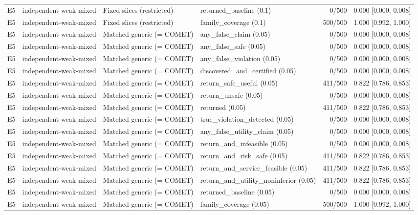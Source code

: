 \begin{longtable}{p{.04\linewidth}p{.18\linewidth}p{.19\linewidth}p{.16\linewidth}r p{.21\linewidth}}
E5 & independent-weak-mixed & Fixed slices (restricted) & returned\_baseline (0.1) & 0/500 & 0.000 [0.000, 0.008]\\
E5 & independent-weak-mixed & Fixed slices (restricted) & family\_coverage (0.1) & 500/500 & 1.000 [0.992, 1.000]\\
E5 & independent-weak-mixed & Matched generic (= COMET) & any\_false\_claim (0.05) & 0/500 & 0.000 [0.000, 0.008]\\
E5 & independent-weak-mixed & Matched generic (= COMET) & any\_false\_safe (0.05) & 0/500 & 0.000 [0.000, 0.008]\\
E5 & independent-weak-mixed & Matched generic (= COMET) & any\_false\_violation (0.05) & 0/500 & 0.000 [0.000, 0.008]\\
E5 & independent-weak-mixed & Matched generic (= COMET) & discovered\_and\_certified (0.05) & 0/500 & 0.000 [0.000, 0.008]\\
E5 & independent-weak-mixed & Matched generic (= COMET) & return\_safe\_useful (0.05) & 411/500 & 0.822 [0.786, 0.853]\\
E5 & independent-weak-mixed & Matched generic (= COMET) & return\_unsafe (0.05) & 0/500 & 0.000 [0.000, 0.008]\\
E5 & independent-weak-mixed & Matched generic (= COMET) & returned (0.05) & 411/500 & 0.822 [0.786, 0.853]\\
E5 & independent-weak-mixed & Matched generic (= COMET) & true\_violation\_detected (0.05) & 0/500 & 0.000 [0.000, 0.008]\\
E5 & independent-weak-mixed & Matched generic (= COMET) & any\_false\_utility\_claim (0.05) & 0/500 & 0.000 [0.000, 0.008]\\
E5 & independent-weak-mixed & Matched generic (= COMET) & return\_and\_infeasible (0.05) & 0/500 & 0.000 [0.000, 0.008]\\
E5 & independent-weak-mixed & Matched generic (= COMET) & return\_and\_risk\_safe (0.05) & 411/500 & 0.822 [0.786, 0.853]\\
E5 & independent-weak-mixed & Matched generic (= COMET) & return\_and\_service\_feasible (0.05) & 411/500 & 0.822 [0.786, 0.853]\\
E5 & independent-weak-mixed & Matched generic (= COMET) & return\_and\_utility\_noninferior (0.05) & 411/500 & 0.822 [0.786, 0.853]\\
E5 & independent-weak-mixed & Matched generic (= COMET) & returned\_baseline (0.05) & 0/500 & 0.000 [0.000, 0.008]\\
E5 & independent-weak-mixed & Matched generic (= COMET) & family\_coverage (0.05) & 500/500 & 1.000 [0.992, 1.000]\\

\end{longtable}
